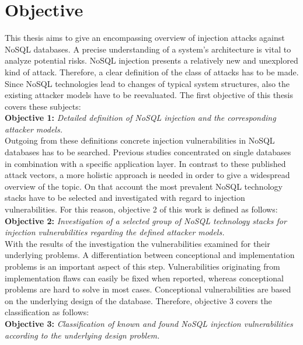 \section{Objective}
\label{sec:objective}
This thesis aims to give an encompassing overview of injection attacks against NoSQL databases. A precise understanding of a system's architecture is vital to analyze potential risks. NoSQL injection presents a relatively new and unexplored kind of attack. Therefore, a clear definition of the class of attacks has to be made. Since NoSQL technologies lead to changes of typical system structures, also the existing attacker models have to be reevaluated. The first objective of this thesis covers these subjects: \\

\textbf{Objective 1:} \textit{Detailed definition of NoSQL injection and the corresponding attacker models.} \\

Outgoing from these definitions concrete injection vulnerabilities in NoSQL databases has to be searched. Previous studies concentrated on single databases in combination with a specific application layer. In contrast to these published attack vectors, a more holistic approach is needed in order to give a widespread overview of the topic. On that account the most prevalent NoSQL technology stacks have to be selected and investigated with regard to injection vulnerabilities. For this reason, objective 2 of this work is defined as follows: \\

\textbf{Objective 2:} \textit{Investigation of a selected group of NoSQL technology stacks for injection vulnerabilities regarding the defined attacker models.} \\

With the results of the investigation the vulnerabilities examined for their underlying problems. A differentiation between conceptional and implementation problems is an important aspect of this step. Vulnerabilities originating from implementation flaws can easily be fixed when reported, whereas conceptional problems are hard to solve in most cases. Conceptional vulnerabilities are based on the underlying design of the database. Therefore, objective 3 covers the classification as follows: \\

\textbf{Objective 3:} \textit{Classification of known and found NoSQL injection vulnerabilities according to the underlying design problem.} \\

